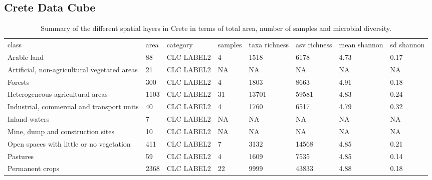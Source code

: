 \subsection{Crete Data Cube}\label{data_cube}

\begin{sidewaystable*}
    \caption{Summary of the different spatial layers in Crete in terms of total area, number of samples and microbial diversity.\label{table:data_cube_summary}}
\begin{tabular*}{\textwidth}{@{\extracolsep{\fill}}llllllll@{\extracolsep{\fill}}}
\tabcolsep=0pt%
class                                           & area & category             & samples & taxa richness & asv richness & mean shannon & sd shannon \\
Arable land                                     & 88   & CLC LABEL2           & 4       & 1518           & 6178          & 4.73          & 0.17        \\
Artificial, non-agricultural vegetated areas    & 21   & CLC LABEL2           & NA      & NA             & NA            & NA            & NA          \\
Forests                                         & 300  & CLC LABEL2           & 4       & 1803           & 8663          & 4.91          & 0.18        \\
Heterogeneous agricultural areas                & 1103 & CLC LABEL2           & 31      & 13701          & 59581         & 4.83          & 0.24        \\
Industrial, commercial and transport units      & 40   & CLC LABEL2           & 4       & 1760           & 6517          & 4.79          & 0.32        \\
Inland waters                                   & 7    & CLC LABEL2           & NA      & NA             & NA            & NA            & NA          \\
Mine, dump and construction sites               & 10   & CLC LABEL2           & NA      & NA             & NA            & NA            & NA          \\
Open spaces with little or no vegetation        & 411  & CLC LABEL2           & 7       & 3132           & 14568         & 4.85          & 0.21        \\
Pastures                                        & 59   & CLC LABEL2           & 4       & 1609           & 7535          & 4.85          & 0.14        \\
Permanent crops                                 & 2368 & CLC LABEL2           & 22      & 9999           & 43833         & 4.88          & 0.18        \\

\end{tabular*}
\end{sidewaystable*}
